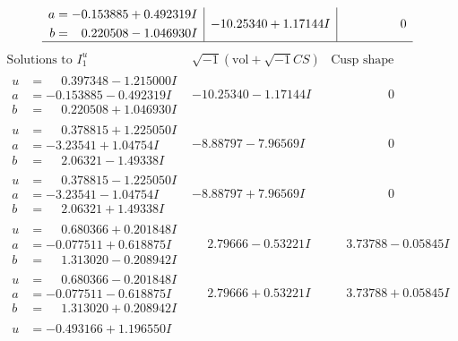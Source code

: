 \documentclass[1p]{elsarticle_modified}
\theoremstyle{definition}
\newcommand{\I}{\sqrt{-1}}
\begin{document}
$$\begin{array}{c|c|c}
\begin{aligned}
a &= -0.153885 + 0.492319 I \\
b &= \phantom{-}0.220508 - 1.046930 I\end{aligned}
 & -10.25340 + 1.17144 I & \phantom{-0.000000 } 0\\
 \hline 
 \end{array}$$\newpage$$\begin{array}{c|c|c}  
\text{Solutions to }I^u_{1}& \I (\text{vol} + \sqrt{-1}CS) & \text{Cusp shape}\\
 \hline 
\begin{aligned}
u &= \phantom{-}0.397348 - 1.215000 I \\
a &= -0.153885 - 0.492319 I \\
b &= \phantom{-}0.220508 + 1.046930 I\end{aligned}
 & -10.25340 - 1.17144 I & \phantom{-0.000000 } 0 \\ \hline\begin{aligned}
u &= \phantom{-}0.378815 + 1.225050 I \\
a &= -3.23541 + 1.04754 I \\
b &= \phantom{-}2.06321 - 1.49338 I\end{aligned}
 & -8.88797 - 7.96569 I & \phantom{-0.000000 } 0 \\ \hline\begin{aligned}
u &= \phantom{-}0.378815 - 1.225050 I \\
a &= -3.23541 - 1.04754 I \\
b &= \phantom{-}2.06321 + 1.49338 I\end{aligned}
 & -8.88797 + 7.96569 I & \phantom{-0.000000 } 0 \\ \hline\begin{aligned}
u &= \phantom{-}0.680366 + 0.201848 I \\
a &= -0.077511 + 0.618875 I \\
b &= \phantom{-}1.313020 - 0.208942 I\end{aligned}
 & \phantom{-}2.79666 - 0.53221 I & \phantom{-}3.73788 - 0.05845 I \\ \hline\begin{aligned}
u &= \phantom{-}0.680366 - 0.201848 I \\
a &= -0.077511 - 0.618875 I \\
b &= \phantom{-}1.313020 + 0.208942 I\end{aligned}
 & \phantom{-}2.79666 + 0.53221 I & \phantom{-}3.73788 + 0.05845 I \\ \hline\begin{aligned}
u &= -0.493166 + 1.196550 I \\

\end{aligned}
\end{array}$$
\end{document}

